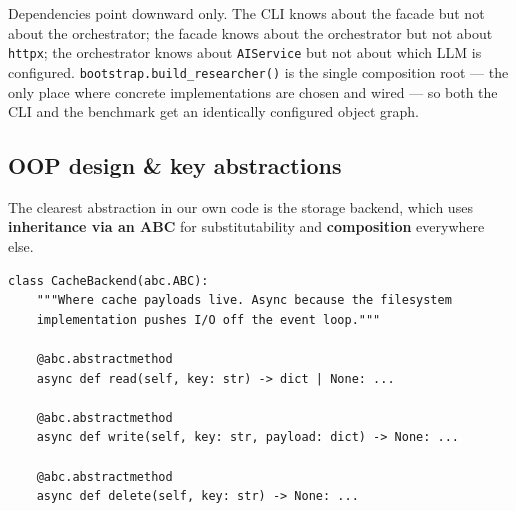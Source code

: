 \documentclass[11pt,a4paper]{article}
\begin{document}
\begin{center}
\end{center}

Dependencies point downward only. The CLI knows about the facade but not about the orchestrator;
the facade knows about the orchestrator but not about \texttt{httpx}; the orchestrator knows about
\texttt{AIService} but not about which LLM is configured. \texttt{bootstrap.build\_researcher()} is
the single composition root --- the only place where concrete implementations are chosen and wired
--- so both the CLI and the benchmark get an identically configured object graph.

\subsection{OOP design \& key abstractions}

The clearest abstraction in our own code is the storage backend, which uses \textbf{inheritance via
an ABC} for substitutability and \textbf{composition} everywhere else.

\begin{lstlisting}[style=python]
class CacheBackend(abc.ABC):
    """Where cache payloads live. Async because the filesystem
    implementation pushes I/O off the event loop."""

    @abc.abstractmethod
    async def read(self, key: str) -> dict | None: ...

    @abc.abstractmethod
    async def write(self, key: str, payload: dict) -> None: ...

    @abc.abstractmethod
    async def delete(self, key: str) -> None: ...
\end{lstlisting}
\end{document}
